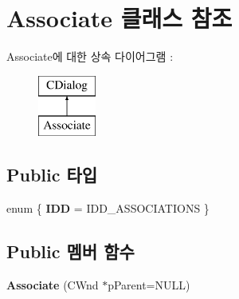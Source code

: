 \hypertarget{class_associate}{}\section{Associate 클래스 참조}
\label{class_associate}
Associate에 대한 상속 다이어그램 \+: \begin{figure}[H]
\begin{center}
\leavevmode
\includegraphics[height=2.000000cm]{class_associate}
\end{center}
\end{figure}
\subsection*{Public 타입}
\begin{DoxyCompactItemize}
\item 
\mbox{\label{class_associate_a9696cb7dfd5bf0a5f848d1c0209ca4f8}} 
enum \{ {\bfseries I\+DD} = I\+D\+D\+\_\+\+A\+S\+S\+O\+C\+I\+A\+T\+I\+O\+NS
 \}
\end{DoxyCompactItemize}
\subsection*{Public 멤버 함수}
\begin{DoxyCompactItemize}
\item 
\mbox{\label{class_associate_a67a8f8b2f0539a32f8d783f60e2d25b9}} 
{\bfseries Associate} (C\+Wnd $\ast$p\+Parent=N\+U\+LL)
\end{DoxyCompactItemize}
